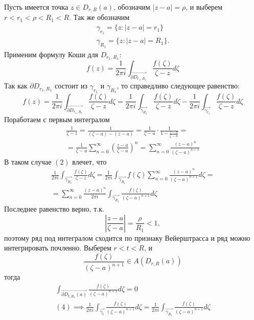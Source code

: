 \documentclass[main]{subfiles}
\begin{document}
\begin{longProof}
    Пусть имеется точка $z \in D_{r, R}(a)$, обозначим $|z-a| = \rho$, и выберем $r < r_1 < \rho < R_1< R$.
    Так же обозначим
    \begin{gather*}
        \gamma_{r_1} = \{z: |z-a| = r_1\} \\
        \gamma_{R_1} = \{z: |z-a| = R_1\}.
    \end{gather*}
    Применим формулу Коши для $D_{r_1, R_1}$:
    \[f(z) = \frac{1}{2 \pi i } \int_{\overrightarrow{\partial D_{r_1, R_1}}} \frac{f(\zeta)}{\zeta - z} d\zeta\]
    Так как $\partial D_{r_1, R_1}$ состоит из $\gamma_{r_1}$ и $\gamma_{R_1}$, то справедливо следующее равенство:
    \[f(z) = \frac{1}{2 \pi i } \int_{\overrightarrow{\partial D_{r_1, R_1}}} \frac{f(\zeta)}{\zeta - z} d\zeta = \frac{1}{2 \pi i } \int_{\overrightarrow{\gamma_{R_1}}} \frac{f(\zeta)}{\zeta - z} d\zeta - \frac{1}{2 \pi i } \int_{\overrightarrow{\gamma_{r_1}}} \frac{f(\zeta)}{\zeta - z} d\zeta \tag{1}\]
    Поработаем с первым интегралом
    \begin{multline*}
        \frac{1}{\zeta - z} = \frac{1}{(\zeta - a) - (z - a)} = \frac{1}{\zeta - a}\cdot \frac{1}{1 - \frac{z - a}{\zeta - a}} = \\
        = \frac{1}{\zeta - a} \sum_{n = 0 }^{\infty} \left(\frac{z - a}{\zeta -a}\right)^n =\sum_{n = 0 }^{\infty} \frac{(z - a)^n}{(\zeta -a)^{n+1}} \tag{2}
    \end{multline*}
    В таком случае $(2)$ влечет, что
    \begin{multline*}
        \frac{1}{2 \pi i} \int_{\overrightarrow{\gamma_{R_1}}} \frac{f(\zeta)}{\zeta - z} d\zeta = \frac{1}{2 \pi i} \int_{\overrightarrow{\gamma_{R_1}}} f(\zeta) \sum_{n = 0 }^{\infty} \frac{(z - a)^n}{(\zeta -a)^{n+1}} d\zeta = \\
        = \sum_{n = 0 }^{\infty} \frac{(z - a)^n}{2 \pi i}  \int_{\overrightarrow{\gamma_{R_1}}} \frac{f(\zeta)}{(\zeta -a)^{n+1}} d\zeta \tag{3}
    \end{multline*}
    Последнее равенство верно, т.к.
    \[\left| \frac{z-a}{\zeta - a} \right| = \frac{\rho}{R_1} < 1,\]
    поэтому ряд под интегралом сходится по признаку Вейерштрасса и ряд можно интегрировать почленно.
    Выберем $r < t < R$, и
    \[\frac{f(\zeta)}{(\zeta - a)^{n+1}} \in A(D_{r,R}(a))\]
    тогда
    \begin{gather*}
        \int_{\overrightarrow{\partial D_{t, R_1} (a)}} \frac{f(\zeta)}{(\zeta -a)^{n+1}} d\zeta = 0  \tag{4}\\
        (4) \implies \frac{1}{2 \pi i}  \int_{\overrightarrow{\gamma_{t}}} \frac{f(\zeta)}{(\zeta -a)^{n+1}} d\zeta =  \frac{1}{2 \pi i}  \int_{\overrightarrow{\gamma_{R_1}}} \frac{f(\zeta)}{(\zeta -a)^{n+1}} d\zeta \tag{5}

\end{gather*}
\end{longProof}
\end{document}
